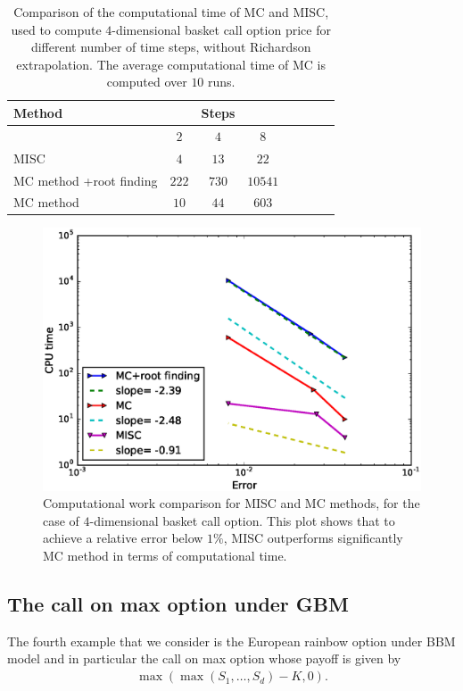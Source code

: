 \begin{table}[h!]
	\centering
	\begin{tabular}{l*{6}{c}r}
		\toprule[1.5pt]
	Method & & Steps  & &     \\
	\hline
	         & $2$ & $4$ & $8$    \\
		\hline
		MISC & $4$  & $13$ & $22$     \\
			MC method +root finding  & $222$&  $730$&  $10541$   \\
				MC method &   $10$& $44$ &   $603$ \\
		\bottomrule[1.25pt]
	\end{tabular}
	\caption{Comparison of the computational time of  MC and MISC, used to compute $4$-dimensional basket call option price  for different number of time steps, without Richardson extrapolation. The average computational time of MC is computed over $10$ runs.}
	\label{Comparsion of the computational time of  MC and MISC, used to compute 4 dim basket Call option price  for different number of time steps, without Richardson extrapolation}
\end{table}


\FloatBarrier


	\begin{figure}[h!]
\centering
\includegraphics[width=0.4\linewidth]{./figures/basket_call_4d_time_stepping/complexity_rates/error_vs_time}

\caption{Computational work comparison for MISC and MC methods, for the case of $4$-dimensional basket call option. This plot shows that to achieve a relative error below $1\%$, MISC outperforms significantly MC method in terms of computational time.}
\label{fig:Complexity plot for MC and MISC , 4 dim basket call non rich}
\end{figure}


\FloatBarrier

\subsection{The call on max  option under GBM}\label{sec:The best call option  under GBM}
The fourth example that we consider is  the European rainbow option under BBM model and in particular the call on max option whose payoff is given by
\begin{align}\label{eq:max_call_option}
\max\left( \max\left(S_1,\dots,S_d\right)-K,0 \right).
\end{align}


